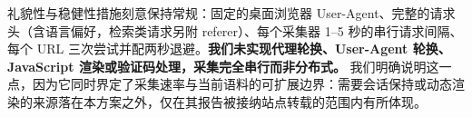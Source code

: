 \documentclass[11pt]{article}
\begin{document}
{\cjkfont 礼\allowbreak 貌\allowbreak 性\allowbreak 与\allowbreak 稳\allowbreak 健\allowbreak 性\allowbreak 措\allowbreak 施\allowbreak 刻\allowbreak 意\allowbreak 保\allowbreak 持\allowbreak 常\allowbreak 规\allowbreak ：\allowbreak 固\allowbreak 定\allowbreak 的\allowbreak 桌\allowbreak 面\allowbreak 浏\allowbreak 览\allowbreak 器} User-Agent{\cjkfont 、\allowbreak 完\allowbreak 整\allowbreak 的\allowbreak 请\allowbreak 求\allowbreak 头\allowbreak （\allowbreak 含\allowbreak 语\allowbreak 言\allowbreak 偏\allowbreak 好\allowbreak ，\allowbreak 检\allowbreak 索\allowbreak 类\allowbreak 请\allowbreak 求\allowbreak 另\allowbreak 附} referer{\cjkfont ）\allowbreak 、\allowbreak 每\allowbreak 个\allowbreak 采\allowbreak 集\allowbreak 器} 1--5 {\cjkfont 秒\allowbreak 的\allowbreak 串\allowbreak 行\allowbreak 请\allowbreak 求\allowbreak 间\allowbreak 隔\allowbreak 、\allowbreak 每\allowbreak 个} URL {\cjkfont 三\allowbreak 次\allowbreak 尝\allowbreak 试\allowbreak 并\allowbreak 配\allowbreak 两\allowbreak 秒\allowbreak 退\allowbreak 避\allowbreak 。}\textbf{{\cjkfont 我\allowbreak 们\allowbreak 未\allowbreak 实\allowbreak 现\allowbreak 代\allowbreak 理\allowbreak 轮\allowbreak 换\allowbreak 、}User-Agent {\cjkfont 轮\allowbreak 换\allowbreak 、}JavaScript {\cjkfont 渲\allowbreak 染\allowbreak 或\allowbreak 验\allowbreak 证\allowbreak 码\allowbreak 处\allowbreak 理\allowbreak ，\allowbreak 采\allowbreak 集\allowbreak 完\allowbreak 全\allowbreak 串\allowbreak 行\allowbreak 而\allowbreak 非\allowbreak 分\allowbreak 布\allowbreak 式\allowbreak 。}} {\cjkfont 我\allowbreak 们\allowbreak 明\allowbreak 确\allowbreak 说\allowbreak 明\allowbreak 这\allowbreak 一\allowbreak 点\allowbreak ，\allowbreak 因\allowbreak 为\allowbreak 它\allowbreak 同\allowbreak 时\allowbreak 界\allowbreak 定\allowbreak 了\allowbreak 采\allowbreak 集\allowbreak 速\allowbreak 率\allowbreak 与\allowbreak 当\allowbreak 前\allowbreak 语\allowbreak 料\allowbreak 的\allowbreak 可\allowbreak 扩\allowbreak 展\allowbreak 边\allowbreak 界\allowbreak ：\allowbreak 需\allowbreak 要\allowbreak 会\allowbreak 话\allowbreak 保\allowbreak 持\allowbreak 或\allowbreak 动\allowbreak 态\allowbreak 渲\allowbreak 染\allowbreak 的\allowbreak 来\allowbreak 源\allowbreak 落\allowbreak 在\allowbreak 本\allowbreak 方\allowbreak 案\allowbreak 之\allowbreak 外\allowbreak ，\allowbreak 仅\allowbreak 在\allowbreak 其\allowbreak 报\allowbreak 告\allowbreak 被\allowbreak 接\allowbreak 纳\allowbreak 站\allowbreak 点\allowbreak 转\allowbreak 载\allowbreak 的\allowbreak 范\allowbreak 围\allowbreak 内\allowbreak 有\allowbreak 所\allowbreak 体\allowbreak 现\allowbreak 。}
\end{document}
